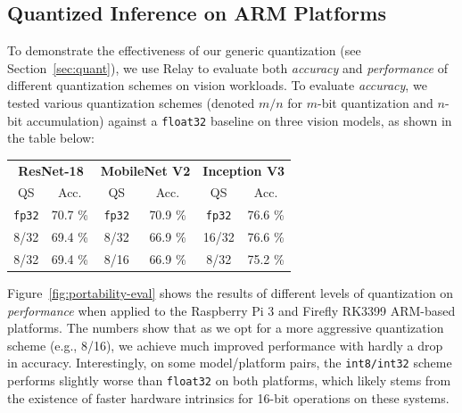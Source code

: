 \subsection{Quantized Inference on ARM Platforms}
To demonstrate the effectiveness of our generic quantization (see Section~\ref{sec:quant}),
  we use Relay to evaluate both \textit{accuracy} and \textit{performance} of different
  quantization schemes on vision workloads.
To evaluate \textit{accuracy},
  we tested various quantization schemes
  (denoted $m/n$ for $m$-bit quantization and $n$-bit accumulation)
  against a \texttt{float32} baseline on three vision models,
  as shown in the table below:
\begin{center}
  \begin{tabular}{|c|c||c|c||c|c|}
    \hline
    \multicolumn{2}{|c}{\textbf{ResNet-18}} & \multicolumn{2}{c}{\textbf{MobileNet V2}} & \multicolumn{2}{c|}{\textbf{Inception V3}} \\
    \multicolumn{1}{|c}{QS}    & \multicolumn{1}{c}{Acc.}   &  \multicolumn{1}{c}{QS}  & \multicolumn{1}{c}{Acc.}  & \multicolumn{1}{c}{QS}  & \multicolumn{1}{c|}{Acc.} \\
    \hline
    \texttt{fp32} & 70.7 \%    & \texttt{fp32} & 70.9 \%       & \texttt{fp32} & 76.6 \% \\
    8/32         & 69.4 \%    & 8/32         & 66.9 \%       & 16/32        & 76.6 \% \\
    8/32         & 69.4 \%    & 8/16         & 66.9 \%       & 8/32         & 75.2 \% \\
    \hline
  \end{tabular}
\end{center}
Figure~\ref{fig:portability-eval} shows the results of different
  levels of quantization on \textit{performance} when applied to the Raspberry Pi 3
  and Firefly RK3399 ARM-based platforms.
The numbers show that as we opt for a more aggressive quantization scheme
  (e.g., 8/16),
  we achieve much improved performance with hardly a drop in accuracy.
Interestingly,
  on some model/platform pairs,
  the \texttt{int8/int32} scheme performs slightly worse than \texttt{float32} on both platforms,
  which likely stems from the existence of faster hardware intrinsics for 16-bit operations on these systems.

